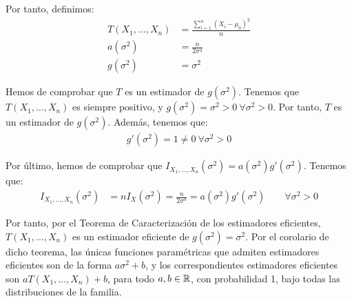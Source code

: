 \begin{ejemplo}
\begin{enumerate}
        Por tanto, definimos:
        \begin{align*}
            T(X_1, \ldots, X_n) &= \frac{\sum\limits_{i=1}^n (X_i-\mu_0)^2}{n}\\
            a(\sigma^2) &= \frac{n}{2\sigma^4}\\
            g(\sigma^2) &= \sigma^2
        \end{align*}

        Hemos de comprobar que $T$ es un estimador de $g(\sigma^2)$. Tenemos que $T(X_1, \ldots, X_n)$ es siempre positivo, y $g(\sigma^2) = \sigma^2 > 0\ \forall \sigma^2 > 0$. Por tanto, $T$ es un estimador de $g(\sigma^2)$. Además, tenemos que:
        \begin{align*}
            g'(\sigma^2) = 1 \neq 0\ \forall \sigma^2 > 0
        \end{align*}
        
        Por último, hemos de comprobar que $I_{X_1, \ldots, X_n}(\sigma^2) = a(\sigma^2) g'(\sigma^2)$. Tenemos que:
        \begin{align*}
            I_{X_1, \ldots, X_n}(\sigma^2) &= n I_X(\sigma^2) = \frac{n}{2\sigma^4} = a(\sigma^2) g'(\sigma^2)\qquad \forall \sigma^2 > 0
        \end{align*}

        Por tanto, por el Teorema de Caracterización de los estimadores eficientes, $T(X_1, \ldots, X_n)$ es un estimador eficiente de $g(\sigma^2) = \sigma^2$. Por el corolario de dicho teorema, las únicas funciones paramétricas que admiten estimadores eficientes son de la forma $a\sigma^2 + b$, y los correspondientes estimadores eficientes son $aT(X_1, \ldots, X_n) + b$, para todo $a, b \in \mathbb{R}$, con probabilidad 1, bajo todas las distribuciones de la familia.
    \end{enumerate}
\end{ejemplo}